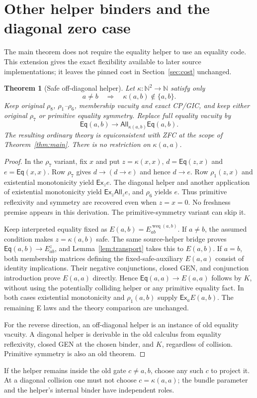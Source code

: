 \documentclass[11pt,letterpaper]{article}
\newtheorem{theorem}{Theorem}[section]
\theoremstyle{definition}\newtheorem{definition}[theorem]{Definition}
\theoremstyle{remark}\newtheorem{remark}[theorem]{Remark}
\newcommand{\Eq}{\mathsf{Eq}}
\newcommand{\All}{\mathsf{All}}
\newcommand{\Ex}{\mathsf{Ex}}
\newcommand{\weq}{\operatorname{weq}}
\newcommand{\To}{\rightarrow}
\begin{document}
\appendix
\section{Other helper binders and the diagonal zero case}\label{sec:kappa}
The main theorem does not require the equality helper to use an equality code. This extension gives the exact flexibility available to later source implementations; it leaves the pinned cost in Section~\ref{sec:cost} unchanged.

\begin{theorem}[Safe off-diagonal helper]\label{thm:kappa}
Let $\kappa:\mathbb N^2\To\mathbb N$ satisfy only
\[
 a\ne b\quad\Longrightarrow\quad\kappa(a,b)\notin\{a,b\}.
\]
Keep original $\rho_8$, $\rho_1$--$\rho_6$, membership vacuity and exact CP/GIC, and keep either original $\rho_7$ or primitive equality symmetry. Replace full equality vacuity by
\[
 \Eq(a,b)\To\All_{\kappa(a,b)}\Eq(a,b).
\]
The resulting ordinary theory is equiconsistent with ZFC at the scope of Theorem~\ref{thm:main}. There is no restriction on $\kappa(a,a)$.
\end{theorem}
\begin{proof}
In the $\rho_7$ variant, fix $x$ and put $z=\kappa(x,x)$, $d=\Eq(z,x)$ and $e=\Eq(x,x)$. Row $\rho_7$ gives $d\To(d\To e)$ and hence $d\To e$. Row $\rho_1(z,x)$ and existential monotonicity yield $\Ex_z e$. The diagonal helper and another application of existential monotonicity yield $\Ex_z\All_z e$, and $\rho_6$ yields $e$. Thus primitive reflexivity and symmetry are recovered even when $z=x=0$. No freshness premise appears in this derivation. The primitive-symmetry variant can skip it.

Keep interpreted equality fixed as $E(a,b)=E_{ab}^{\weq(a,b)}$. If $a\ne b$, the assumed condition makes $z=\kappa(a,b)$ safe. The same source-helper bridge proves $\Eq(a,b)\To E_{ab}^{z}$, and Lemma~\ref{lem:transport} takes this to $E(a,b)$. If $a=b$, both membership matrices defining the fixed-safe-auxiliary $E(a,a)$ consist of identity implications. Their negative conjunctions, closed GEN, and conjunction introduction prove $E(a,a)$ directly. Hence $\Eq(a,a)\To E(a,a)$ follows by $K$, without using the potentially colliding helper or any primitive equality fact. In both cases existential monotonicity and $\rho_1(a,b)$ supply $\Ex_a E(a,b)$. The remaining E laws and the theory comparison are unchanged.

For the reverse direction, an off-diagonal helper is an instance of old equality vacuity. A diagonal helper is derivable in the old calculus from equality reflexivity, closed GEN at the chosen binder, and $K$, regardless of collision. Primitive symmetry is also an old theorem.
\end{proof}
If the helper remains inside the old gate $c\ne a,b$, choose any such $c$ to project it. At a diagonal collision one must not choose $c=\kappa(a,a)$; the bundle parameter and the helper's internal binder have independent roles.
\end{document}
